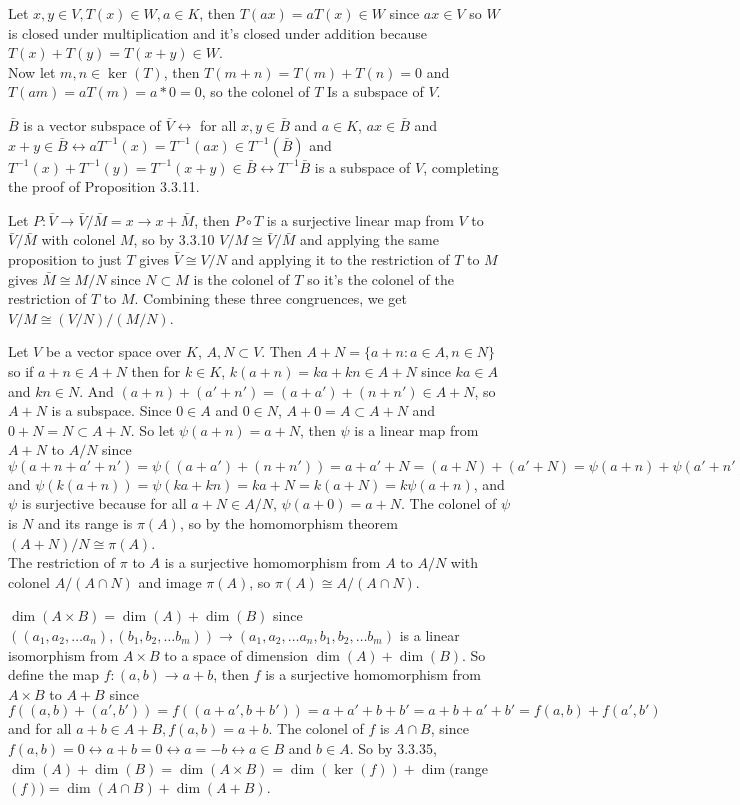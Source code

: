 \documentclass[11pt, oneside]{article}   	%
\newcommand{\inv}{^{-1}}
\newcommand{\lra}{\leftrightarrow}
\begin{document}
\item Let $x, y \in V, T(x) \in W, a\in K$, then $T(ax) = aT(x) \in W$ since $ax \in V$ so $W$ is closed under multiplication and it's closed under addition because $T(x) + T(y) = T(x + y) \in W$. \\
Now let $m, n\in \ker(T)$, then $T(m + n) = T(m) + T(n) = 0$ and $T(am) = aT(m) = a * 0 = 0$, so the colonel of $T$ Is a subspace of $V$. 
\item $\bar{B}$ is a vector subspace of $\bar{V} \lra$ for all $x, y \in \bar{B}$ and $a \in K$, $ax \in \bar{B} $ and $x + y \in \bar{B} \lra aT\inv(x) = T\inv(ax) \in T\inv(\bar{B})$ and $T\inv(x) + T\inv(y) = T\inv(x + y) \in \bar{B} \lra T\inv\bar{B}$ is a subspace of $V$, completing the proof of Proposition 3.3.11. 
\item Let $P: \bar{V} \to \bar{V}/\bar{M} = x\to x + \bar{M}$, then $P \circ T$ is a surjective linear map from $V$ to $\bar{V} / \bar{M}$ with colonel $M$, so by 3.3.10 $V / M \cong \bar{V} / \bar{M}$ and applying the same proposition to just $T$ gives $\bar{V} \cong V / N$ and applying it to the restriction of $T$ to $M$ gives $\bar{M} \cong M / N$ since $N \subset M$ is the colonel of $T$ so it's the colonel of the restriction of $T$ to $M$. Combining these three congruences, we get $V / M \cong (V / N) / (M / N)$.
\item Let $V$ be a vector space over $K$, $A, N \subset V$. Then $A + N = \{a + n : a \in A, n \in N\}$ so if $a + n \in A + N$ then for $k \in K$, $k(a + n) = ka + kn \in A + N$ since $ka \in A$ and $kn \in N$. And $(a + n) + (a' + n') = (a + a') + (n + n') \in A + N$, so $A + N$ is a subspace. Since $0 \in A$ and $0 \in N$, $A + 0 = A \subset A + N$ and $0 + N = N \subset A + N$. So let $\psi(a + n) = a + N$, then $\psi$ is a linear map from $A + N$ to $A/N$ since $\psi(a + n + a' + n') = \psi((a + a') + (n + n')) = a + a' + N = (a + N) + (a' + N) = \psi(a + n) + \psi(a' + n')$ and $\psi(k(a + n)) = \psi(ka + kn) = ka + N = k(a + N) = k\psi(a + n)$, and $\psi$ is surjective because for all $a + N \in A / N$, $\psi(a + 0) = a + N$. The colonel of $\psi$ is $N$ and its range is $\pi(A)$, so by the homomorphism theorem $(A + N) / N \cong \pi(A)$. \\
The restriction of $\pi$ to $A$ is a surjective homomorphism from $A$ to $A / N$ with colonel $A / (A \cap N)$ and image $\pi(A)$, so $\pi(A) \cong A / (A \cap N)$.
\item $\dim(A \times B) = \dim(A) + \dim(B)$ since $((a_1, a_2, \ldots a_n), (b_1, b_2, \ldots b_m)) \to (a_1, a_2, \ldots a_n, b_1, b_2, \ldots b_m)$ is a linear isomorphism from $A \times B$ to a space of dimension $\dim(A) + \dim(B)$. So define the map $f: (a, b) \to a + b$, then $f$ is a surjective homomorphism from $A \times B$ to $A + B$ since $f((a, b) + (a', b')) = f((a + a', b + b')) = a + a' + b + b' = a + b + a' + b' = f(a, b) + f(a', b')$ and for all $a+b \in A + B, f(a, b) = a + b$. The colonel of $f$ is $A\cap B$, since $f(a, b) = 0 \lra a + b = 0 \lra a = -b \lra a \in B$ and $b \in A$. So by 3.3.35, $\dim(A) + \dim(B) = \dim(A \times B) = \dim(\ker(f)) + \dim($range$(f)) = \dim(A \cap B) + \dim(A + B)$. 
\end{document}
